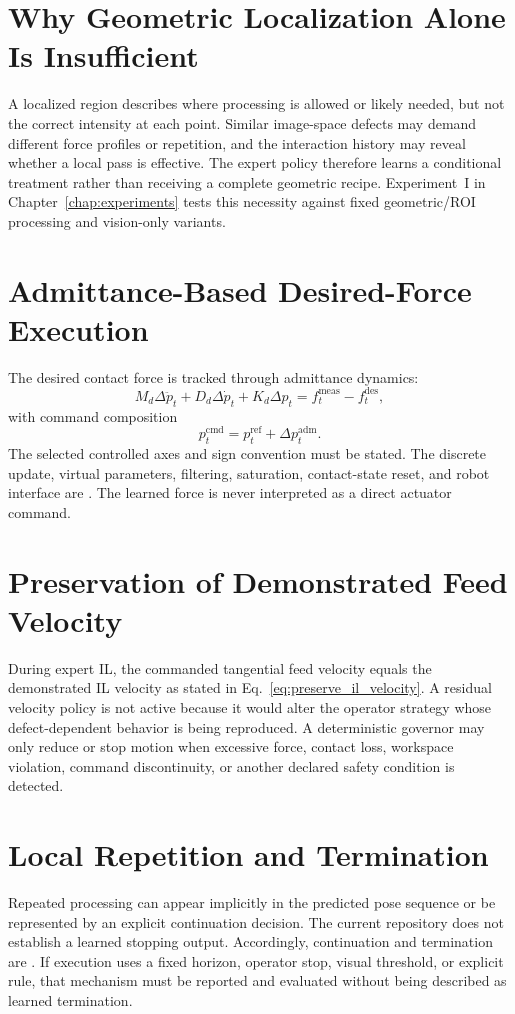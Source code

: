 \section{Why Geometric Localization Alone Is Insufficient}
A localized region describes where processing is allowed or likely needed, but not the correct intensity at each point. Similar image-space defects may demand different force profiles or repetition, and the interaction history may reveal whether a local pass is effective. The expert policy therefore learns a conditional treatment rather than receiving a complete geometric recipe. Experiment~I in Chapter~\ref{chap:experiments} tests this necessity against fixed geometric/ROI processing and vision-only variants.

\section{Admittance-Based Desired-Force Execution}
\label{sec:admittance_il}
The desired contact force is tracked through admittance dynamics:
\begin{equation}
  M_d\Delta\ddot p_t+
  D_d\Delta\dot p_t+
  K_d\Delta p_t
  =
  f_t^{\mathrm{meas}}-f_t^{\mathrm{des}},
  \label{eq:admittance_il}
\end{equation}
with command composition
\begin{equation}
  p_t^{\mathrm{cmd}}=p_t^{\mathrm{ref}}+\Delta p_t^{\mathrm{adm}}.
  \label{eq:il_position_command}
\end{equation}
The selected controlled axes and sign convention must be stated. The discrete update, virtual parameters, filtering, saturation, contact-state reset, and robot interface are . The learned force is never interpreted as a direct actuator command.

\section{Preservation of Demonstrated Feed Velocity}
During expert IL, the commanded tangential feed velocity equals the demonstrated IL velocity as stated in Eq.~\eqref{eq:preserve_il_velocity}. A residual velocity policy is not active because it would alter the operator strategy whose defect-dependent behavior is being reproduced. A deterministic governor may only reduce or stop motion when excessive force, contact loss, workspace violation, command discontinuity, or another declared safety condition is detected.

\section{Local Repetition and Termination}
Repeated processing can appear implicitly in the predicted pose sequence or be represented by an explicit continuation decision. The current repository does not establish a learned stopping output. Accordingly, continuation and termination are . If execution uses a fixed horizon, operator stop, visual threshold, or explicit rule, that mechanism must be reported and evaluated without being described as learned termination.

